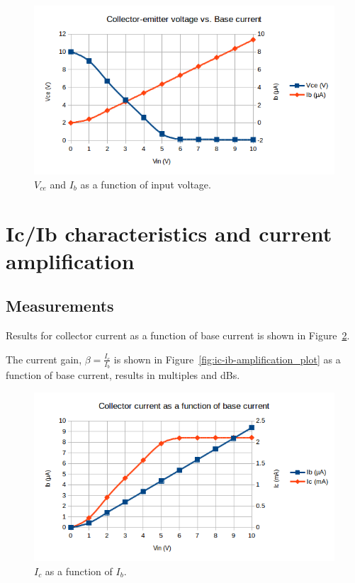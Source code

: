 \documentclass[11pt,a4paper]{article}
\begin{document}
\begin{figure}[htbp]
    \centering
    \includegraphics[width=\textwidth]{img/uce-ib_plot}
    \caption{$V_{ce}$ and $I_{b}$ as a function of input voltage.}
    \label{fig:uce-ib_plot}
\end{figure}

\section{Ic/Ib characteristics and current
amplification}\label{icib-characteristics-and-current-amplification}

\subsection{Measurements}\label{measurements-1}

Results for collector current as a function of base current is shown in Figure~\ref{fig:ic-ib_plot}.

The current gain, $\beta = \frac{I_{c}}{I_{b}}$ is shown in Figure~\ref{fig:ic-ib-amplification_plot}
as a function of base current, results in multiples and dBs.

\begin{figure}[htbp]
    \centering
    \includegraphics[width=\textwidth]{img/ic-ib_plot.png}
    \caption{$I_{c}$ as a function of $I_{b}$.}
    \label{fig:ic-ib_plot}
\end{figure}
\end{document}

